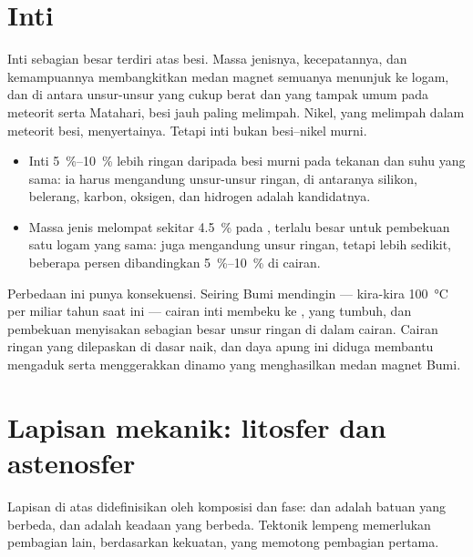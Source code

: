 \section{Inti}

Inti sebagian besar terdiri atas besi. Massa jenisnya, kecepatannya, dan kemampuannya membangkitkan medan magnet semuanya menunjuk ke logam, dan di antara unsur-unsur yang cukup berat dan yang tampak umum pada meteorit serta Matahari, besi jauh paling melimpah. Nikel, yang melimpah dalam meteorit besi, menyertainya. Tetapi inti bukan besi--nikel murni.
\begin{itemize}
  \item Inti \qtyrange{5}{10}{\percent} lebih ringan daripada besi murni pada tekanan dan suhu yang sama: ia harus mengandung unsur-unsur ringan, di antaranya silikon, belerang, karbon, oksigen, dan hidrogen adalah kandidatnya.
  \item Massa jenis melompat sekitar \qty{4.5}{\percent} pada , terlalu besar untuk pembekuan satu logam yang sama:  juga mengandung unsur ringan, tetapi lebih sedikit, beberapa persen dibandingkan \qtyrange{5}{10}{\percent} di cairan.
\end{itemize}
Perbedaan ini punya konsekuensi. Seiring Bumi mendingin ---  kira-kira \qty{100}{\degreeCelsius} per miliar tahun saat ini --- cairan inti membeku ke , yang tumbuh, dan
pembekuan menyisakan sebagian besar unsur ringan di dalam cairan. Cairan ringan yang dilepaskan di dasar  naik, dan daya apung ini diduga membantu mengaduk  serta menggerakkan dinamo yang menghasilkan medan magnet Bumi.

\section{Lapisan mekanik: litosfer dan astenosfer}

Lapisan di atas didefinisikan oleh komposisi dan fase:  dan  adalah batuan yang berbeda,  dan  adalah keadaan yang berbeda. Tektonik lempeng memerlukan pembagian lain, berdasarkan kekuatan, yang memotong pembagian pertama.

